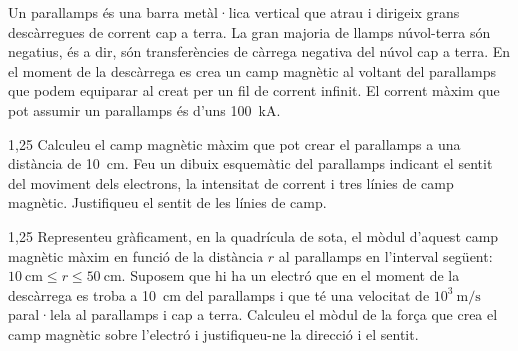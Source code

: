 Un parallamps és una barra metàl·lica vertical que atrau i dirigeix grans descàrregues de corrent cap a terra. La gran majoria de llamps núvol-terra són negatius, és a dir, són transferències de càrrega negativa del núvol cap a terra. En el moment de la descàrrega es crea un camp magnètic al voltant del parallamps que podem equiparar al creat per un fil de corrent infinit. El corrent màxim que pot assumir un parallamps és d'uns 100~kA.

\begin{apartat}{1,25}
Calculeu el camp magnètic màxim que pot crear el parallamps a una distància de 10~cm. Feu un dibuix esquemàtic del parallamps indicant el sentit del moviment dels electrons, la intensitat de corrent i tres línies de camp magnètic. Justifiqueu el sentit de les línies de camp.
\end{apartat}

\begin{apartat}{1,25}
Representeu gràficament, en la quadrícula de sota, el mòdul d'aquest camp magnètic màxim en funció de la distància $r$ al parallamps en l'interval següent: $10\ \mathrm{cm}\le r\le 50\ \mathrm{cm}$. Suposem que hi ha un electró que en el moment de la descàrrega es troba a 10~cm del parallamps i que té una velocitat de $10^{3}\ \mathrm{m/s}$ paral·lela al parallamps i cap a terra. Calculeu el mòdul de la força que crea el camp magnètic sobre l'electró i justifiqueu-ne la direcció i el sentit.
\end{apartat}


